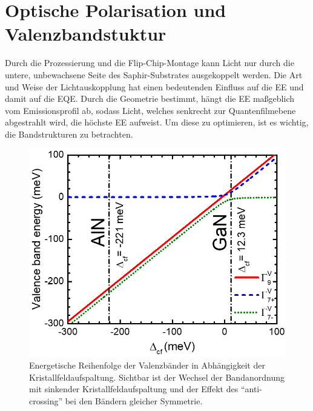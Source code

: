 \thispagestyle{fancy}


\section{Optische Polarisation und Valenzbandstuktur}
\label{chap:polgrund}

Durch die Prozessierung und die Flip-Chip-Montage kann Licht nur durch die untere, unbewachsene Seite des Saphir-Substrates ausgekoppelt werden. Die Art und Weise der Lichtauskopplung hat einen bedeutenden Einfluss auf die EE und damit auf die EQE. Durch die Geometrie bestimmt, hängt die EE maßgeblich vom Emissionsprofil ab, sodass Licht, welches senkrecht zur Quantenfilmebene abgestrahlt wird, die höchste EE aufweist. Um diese zu optimieren, ist es wichtig, die Bandstrukturen zu betrachten.
\begin{figure}[H]
    \centering
    \begin{minipage}[t]{0.49\linewidth}
        \centering
        \includegraphics[width=\linewidth]{Bilder/vancebandPlot.png}
        \caption{Energetische Reihenfolge der Valenzbänder in Abhängigkeit der Kristallfeldaufspaltung. Sichtbar ist der Wechsel der Bandanordnung mit sinkender Kristallfeldaufspaltung und der Effekt des "`anti-crossing"' bei den Bändern gleicher Symmetrie. \cite{doi:10.1063/1.4932651}    }
        \label{fig:auger5k}
    \end{minipage}%
    \hfill
    \begin{minipage}[t]{0.49\linewidth}
        \centering

\end{minipage}
\end{figure}

